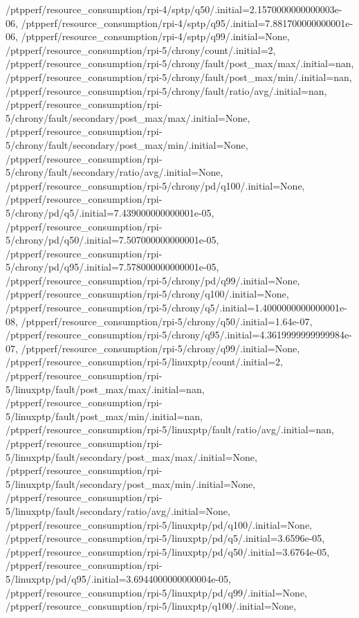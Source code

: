 {    /ptpperf/resource_consumption/rpi-4/sptp/q50/.initial=2.1570000000000003e-06,
    /ptpperf/resource_consumption/rpi-4/sptp/q95/.initial=7.881700000000001e-06,
    /ptpperf/resource_consumption/rpi-4/sptp/q99/.initial=None,
    /ptpperf/resource_consumption/rpi-5/chrony/count/.initial=2,
    /ptpperf/resource_consumption/rpi-5/chrony/fault/post_max/max/.initial=nan,
    /ptpperf/resource_consumption/rpi-5/chrony/fault/post_max/min/.initial=nan,
    /ptpperf/resource_consumption/rpi-5/chrony/fault/ratio/avg/.initial=nan,
    /ptpperf/resource_consumption/rpi-5/chrony/fault/secondary/post_max/max/.initial=None,
    /ptpperf/resource_consumption/rpi-5/chrony/fault/secondary/post_max/min/.initial=None,
    /ptpperf/resource_consumption/rpi-5/chrony/fault/secondary/ratio/avg/.initial=None,
    /ptpperf/resource_consumption/rpi-5/chrony/pd/q100/.initial=None,
    /ptpperf/resource_consumption/rpi-5/chrony/pd/q5/.initial=7.439000000000001e-05,
    /ptpperf/resource_consumption/rpi-5/chrony/pd/q50/.initial=7.507000000000001e-05,
    /ptpperf/resource_consumption/rpi-5/chrony/pd/q95/.initial=7.578000000000001e-05,
    /ptpperf/resource_consumption/rpi-5/chrony/pd/q99/.initial=None,
    /ptpperf/resource_consumption/rpi-5/chrony/q100/.initial=None,
    /ptpperf/resource_consumption/rpi-5/chrony/q5/.initial=1.4000000000000001e-08,
    /ptpperf/resource_consumption/rpi-5/chrony/q50/.initial=1.64e-07,
    /ptpperf/resource_consumption/rpi-5/chrony/q95/.initial=4.3619999999999984e-07,
    /ptpperf/resource_consumption/rpi-5/chrony/q99/.initial=None,
    /ptpperf/resource_consumption/rpi-5/linuxptp/count/.initial=2,
    /ptpperf/resource_consumption/rpi-5/linuxptp/fault/post_max/max/.initial=nan,
    /ptpperf/resource_consumption/rpi-5/linuxptp/fault/post_max/min/.initial=nan,
    /ptpperf/resource_consumption/rpi-5/linuxptp/fault/ratio/avg/.initial=nan,
    /ptpperf/resource_consumption/rpi-5/linuxptp/fault/secondary/post_max/max/.initial=None,
    /ptpperf/resource_consumption/rpi-5/linuxptp/fault/secondary/post_max/min/.initial=None,
    /ptpperf/resource_consumption/rpi-5/linuxptp/fault/secondary/ratio/avg/.initial=None,
    /ptpperf/resource_consumption/rpi-5/linuxptp/pd/q100/.initial=None,
    /ptpperf/resource_consumption/rpi-5/linuxptp/pd/q5/.initial=3.6596e-05,
    /ptpperf/resource_consumption/rpi-5/linuxptp/pd/q50/.initial=3.6764e-05,
    /ptpperf/resource_consumption/rpi-5/linuxptp/pd/q95/.initial=3.6944000000000004e-05,
    /ptpperf/resource_consumption/rpi-5/linuxptp/pd/q99/.initial=None,
    /ptpperf/resource_consumption/rpi-5/linuxptp/q100/.initial=None,
}

